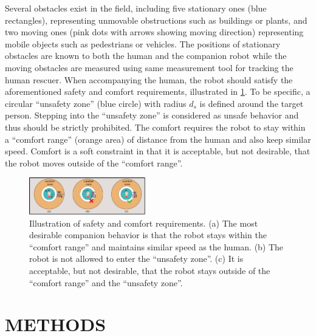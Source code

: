 \documentclass[letterpaper, 10 pt, conference]{ieeeconf}
\begin{document}
	Several obstacles exist in the field, including five stationary ones (blue rectangles), representing unmovable obstructions such as buildings or plants, and two moving ones (pink dots with arrows showing moving direction) representing mobile objects such as pedestrians or vehicles.
	The positions of stationary obstacles are known to both the human and the companion robot while the moving obstacles are measured using same measurement tool for tracking the human rescuer.
	When accompanying the human, the robot should satisfy the aforementioned safety and comfort requirements, illustrated in \cref{fig:zone}.
	To be specific, a circular ``unsafety zone'' (blue circle) with radius $d_s$ is defined around the target person.
	Stepping into the ``unsafety zone'' is considered as unsafe behavior and thus should be strictly prohibited.
	The comfort requires the robot to stay within a ``comfort range'' (orange area) of  distance from the human and also keep similar speed.
	Comfort is a soft constraint in that it is acceptable, but not desirable, that the robot moves outside of the ``comfort range''.
	
	
	\begin{figure}
		\centering		
		\includegraphics[width=0.45\textwidth]{figures/zone}		
		\caption{Illustration of safety and comfort requirements. (a) The most desirable companion behavior is that the robot stays within the ``comfort range'' and maintains similar speed as the human. (b) The robot is not allowed to enter the ``unsafety zone''. (c) It is acceptable, but not desirable, that the robot stays outside of the ``comfort range'' and the ``unsafety zone''.}
		\label{fig:zone}
	\end{figure}
	
	\section{METHODS} \label{sec:framework}
	
\end{document}
